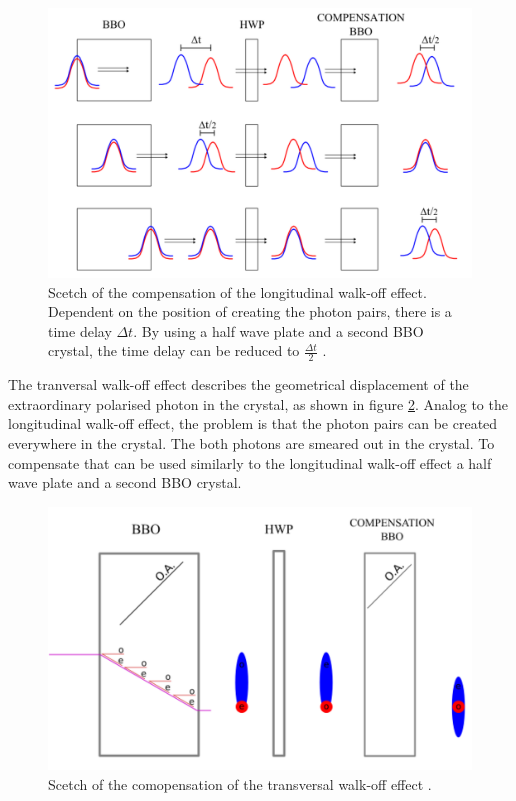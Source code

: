\begin{figure}[H]
\centering
\includegraphics[scale=0.2]{figures/walk_off_longitudinal.PNG}
\caption{Scetch of the compensation of the longitudinal walk-off effect. Dependent on the position of creating the photon pairs, there is a time delay $\Delta t$. By using a half wave plate and a second BBO crystal, the time delay can be reduced to $\frac{\Delta t}{2}$ \cite{fimpel}.   }
\label{fig:walk_off_longitudinal}
\end{figure}
The tranversal walk-off effect describes the geometrical displacement of the extraordinary polarised photon in the crystal, as shown in figure \ref{fig:walk_off_transversal}. Analog to the longitudinal walk-off effect, the problem is that the photon pairs can be created everywhere in the crystal. The both photons are smeared out in the crystal. To compensate that can be used similarly to the longitudinal walk-off effect a half wave plate and a second BBO crystal.
\begin{figure}[H]
\centering
\includegraphics[scale=0.2]{figures/walk_off_transversal.PNG}
\caption{Scetch of the comopensation of the transversal walk-off effect \cite{fimpel}.   }
\label{fig:walk_off_transversal}
\end{figure}
